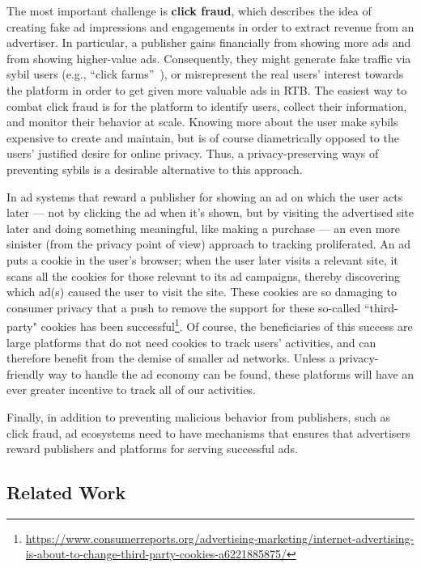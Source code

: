 %
The most important challenge is \textbf{click fraud}, which describes the idea
of creating fake ad impressions and engagements in order to extract revenue from
an advertiser.
%
In particular, a publisher gains financially from showing more ads and from
showing higher-value ads.
%
Consequently, they might generate fake traffic via sybil users (e.g., ``click
farms''~\cite{understanding-ad-fraud}), or misrepresent the real users' interest
towards the platform in order to get given more valuable ads in RTB.
%
The easiest way to combat click fraud is for the platform to identify users,
collect their information, and monitor their behavior at scale.
%
Knowing more about the user make sybils expensive to create and maintain, but is
of course diametrically opposed to the users' justified desire for online
privacy.
%
Thus, a privacy-preserving ways of preventing sybils is a desirable alternative to this approach.


In ad systems that reward a publisher for showing an ad on which the user acts later --- not by clicking the ad when it's shown, but by visiting the advertised site later and doing something meaningful, like making a purchase --- an even more sinister (from the privacy point of view) approach to tracking proliferated.  
%
An ad puts a cookie in the user's browser; when the user later visits a relevant site, it scans all the cookies for those relevant to its ad campaigns, thereby discovering which ad(s) caused the user to visit the site.
%
These cookies are so damaging to consumer privacy that a push to remove the support for these so-called ``third-party" cookies has been successful\footnote{\url{https://www.consumerreports.org/advertising-marketing/internet-advertising-is-about-to-change-third-party-cookies-a6221885875/}}.
%
Of course, the beneficiaries of this success are large platforms that do not need cookies to track users' activities, and can therefore benefit from the demise of smaller ad networks.
%
Unless a privacy-friendly way to handle the ad economy can be found, these platforms will have an ever greater incentive to track all of our activities.

Finally, in addition to preventing malicious behavior from publishers, such as click fraud, ad ecosystems need to have mechanisms that ensures that advertisers reward publishers and platforms for serving successful ads.  




\subsection{Related Work}
\label{s:bg-related}

